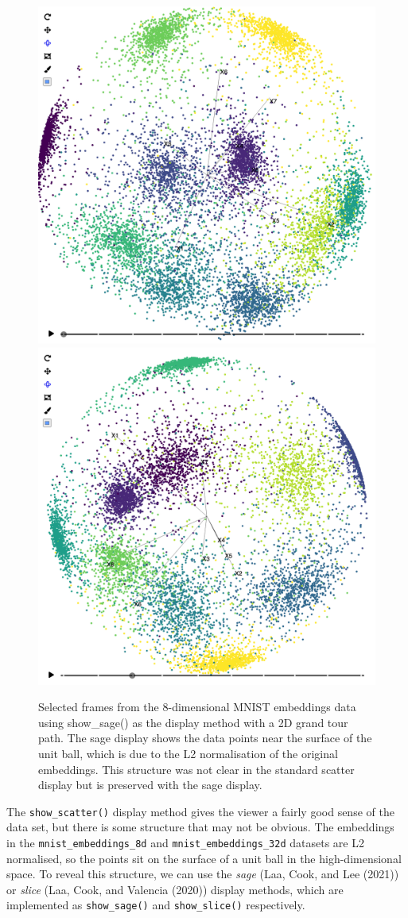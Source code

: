 \begin{figure}

{\centering \includegraphics[width=0.49\linewidth]{figures/mnist/mnist-8d-sage-1} \includegraphics[width=0.49\linewidth]{figures/mnist/mnist-8d-sage-2} 

}

\caption{Selected frames from the 8-dimensional MNIST embeddings data using show\_sage() as the display method with a 2D grand tour path. The sage display shows the data points near the surface of the unit ball, which is due to the L2 normalisation of the original embeddings. This structure was not clear in the standard scatter display but is preserved with the sage display.}\label{fig:mnist-8d-sage}
\end{figure}

The \texttt{show\_scatter()} display method gives the viewer a fairly good sense of the data set, but there is some structure that may not be obvious. The embeddings in the \texttt{mnist\_embeddings\_8d} and \texttt{mnist\_embeddings\_32d} datasets are L2 normalised, so the points sit on the surface of a unit ball in the high-dimensional space. To reveal this structure, we can use the \emph{sage} (Laa, Cook, and Lee (2021)) or \emph{slice} (Laa, Cook, and Valencia (2020)) display methods, which are implemented as \texttt{show\_sage()} and \texttt{show\_slice()} respectively.

